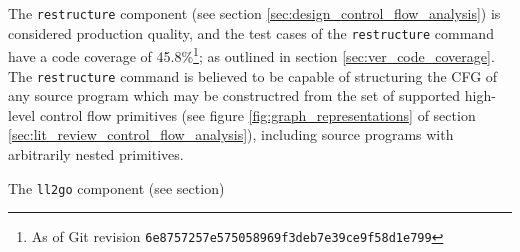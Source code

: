 The \texttt{restructure} component (see section \ref{sec:design_control_flow_analysis}) is considered production quality, and the test cases of the \texttt{restructure} command have a code coverage of 45.8\%\footnote{As of Git revision \texttt{6e8757257e575058969f3deb7e39ce9f58d1e799}}; as outlined in section \ref{sec:ver_code_coverage}. The \texttt{restructure} command is believed to be capable of structuring the CFG of any source program which may be constructred from the set of supported high-level control flow primitives (see figure \ref{fig:graph_representations} of section \ref{sec:lit_review_control_flow_analysis}), including source programs with arbitrarily nested primitives.

The \texttt{ll2go} component (see section)






